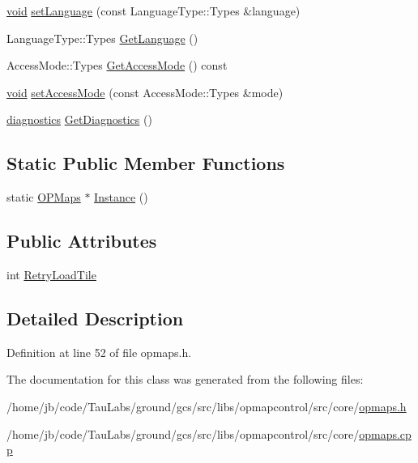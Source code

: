 \begin{DoxyCompactItemize}
\item 
\hyperlink{group___u_a_v_objects_plugin_ga444cf2ff3f0ecbe028adce838d373f5c}{void} \hyperlink{group___o_p_map_widget_gae64b24b63987a957d4365fcca6bab5e5}{set\-Language} (const \-Language\-Type\-::\-Types \&language)
\item 
\-Language\-Type\-::\-Types \hyperlink{group___o_p_map_widget_gaef0dbfe6f1a4d195b33a070779dffc33}{\-Get\-Language} ()
\item 
\-Access\-Mode\-::\-Types \hyperlink{group___o_p_map_widget_ga9903355f0dd5ff46a913e1a02bb059ea}{\-Get\-Access\-Mode} () const 
\item 
\hyperlink{group___u_a_v_objects_plugin_ga444cf2ff3f0ecbe028adce838d373f5c}{void} \hyperlink{group___o_p_map_widget_ga68cf9ffb0f3ff2362243777dbd773437}{set\-Access\-Mode} (const \-Access\-Mode\-::\-Types \&mode)
\item 
\hyperlink{structdiagnostics}{diagnostics} \hyperlink{group___o_p_map_widget_ga4e9750aee8233e707a09efdb60f4c1af}{\-Get\-Diagnostics} ()
\end{DoxyCompactItemize}
\subsection*{\-Static \-Public \-Member \-Functions}
\begin{DoxyCompactItemize}
\item 
static \hyperlink{classcore_1_1_o_p_maps}{\-O\-P\-Maps} $\ast$ \hyperlink{group___o_p_map_widget_ga20822cc13b7089e598c95023a90ed036}{\-Instance} ()
\end{DoxyCompactItemize}
\subsection*{\-Public \-Attributes}
\begin{DoxyCompactItemize}
\item 
int \hyperlink{group___o_p_map_widget_ga21cb35ff34ca1e5eccfe7a0c8f054933}{\-Retry\-Load\-Tile}
\end{DoxyCompactItemize}


\subsection{\-Detailed \-Description}


\-Definition at line 52 of file opmaps.\-h.



\-The documentation for this class was generated from the following files\-:\begin{DoxyCompactItemize}
\item 
/home/jb/code/\-Tau\-Labs/ground/gcs/src/libs/opmapcontrol/src/core/\hyperlink{opmaps_8h}{opmaps.\-h}\item 
/home/jb/code/\-Tau\-Labs/ground/gcs/src/libs/opmapcontrol/src/core/\hyperlink{opmaps_8cpp}{opmaps.\-cpp}\end{DoxyCompactItemize}
